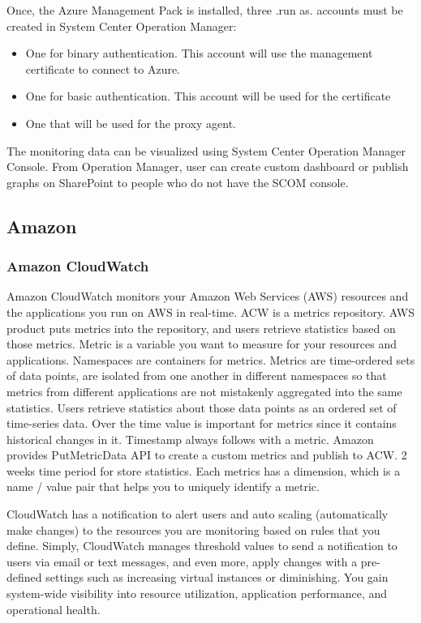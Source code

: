 \documentclass{sig-alternate}
\begin{document}
Once, the Azure Management Pack is installed, three .run as. accounts must be created in System Center Operation Manager:

\begin{itemize}
 \item One for binary authentication. This account will use the management certificate to connect to Azure.
 \item One for basic authentication. This account will be used for the certificate
 \item One that will be used for the proxy agent.
\end{itemize}
 
The monitoring data can be visualized using System Center Operation Manager Console. From Operation Manager, user can create custom dashboard or publish graphs on SharePoint to people who do not have the SCOM console.

\subsection{Amazon}

\subsubsection{Amazon CloudWatch}

Amazon CloudWatch monitors your Amazon Web Services (AWS) resources and the applications you run on AWS in real-time. ACW is a metrics repository. AWS product puts metrics into the repository, and users retrieve statistics based on those metrics. Metric is a variable you want to measure for your resources and applications. Namespaces are containers for metrics. Metrics are time-ordered sets of data points, are isolated from one another in different namespaces so that metrics from different applications are not mistakenly aggregated into the same statistics. Users retrieve statistics about those data points as an ordered set of time-series data. Over the time value is important for metrics since it contains historical changes in it. Timestamp always follows with a metric. Amazon provides PutMetricData API to create a custom metrics and publish to ACW. 2 weeks time period for store statistics. Each metrics has a dimension, which is a name / value pair that helps you to uniquely identify a metric.

CloudWatch has a notification to alert users and auto scaling (automatically make changes) to the resources you are monitoring based on rules that you define. Simply, CloudWatch manages threshold values to send a notification to users via email or text messages, and even more, apply changes with a pre-defined settings such as increasing virtual instances or diminishing. You gain system-wide visibility into resource utilization, application performance, and operational health.
\end{document}
